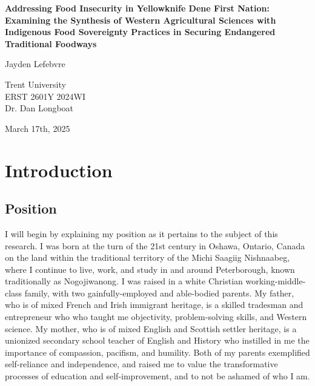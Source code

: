 \documentclass{report}
\begin{document}
\begin{titlepage}
    \begin{center}
        \vspace*{1.2cm}

        \textbf{Addressing Food Insecurity in Yellowknife Dene First Nation: Examining the Synthesis of Western Agricultural Sciences with Indigenous Food Sovereignty Practices in Securing Endangered Traditional Foodways}

        \vspace{2cm}

        Jayden Lefebvre\\

        \vspace{5cm}
        
        Trent University\\
        ERST 2601Y 2024WI\\
        Dr. Dan Longboat\\

        \vfill

        March 17th, 2025
        
    \end{center}
\end{titlepage}

\thispagestyle{plain}
\tableofcontents

\clearpage

\section{Introduction}

\subsection{Position}

\hspace{24pt} I will begin by explaining my position as it pertains to the subject of this research. I was born at the turn of the 21st century in Oshawa, Ontario, Canada on the land within the traditional territory of the Michi Saagiig Nishnaabeg, where I continue to live, work, and study in and around Peterborough, known traditionally as Nogojiwanong. I was raised in a white Christian working-middle-class family, with two gainfully-employed and able-bodied parents. My father, who is of mixed French and Irish immigrant heritage, is a skilled tradesman and entrepreneur who who taught me objectivity, problem-solving skills, and Western science. My mother, who is of mixed English and Scottish settler heritage, is a unionized secondary school teacher of English and History who instilled in me the importance of compassion, pacifism, and humility. Both of my parents exemplified self-reliance and independence, and raised me to value the transformative processes of education and self-improvement, and to not be ashamed of who I am.
\end{document}
